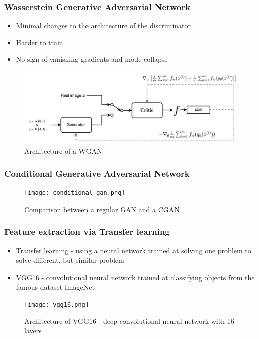 \documentclass{beamer}
\begin{document}
\begin{frame}
\frametitle{Wasserstein Generative Adversarial Network}
\begin{itemize}
\item Minimal changes to the architecture of the discriminator
\item Harder to train
\item No sign of vanishing gradients and mode collapse
\end{itemize}
\begin{figure}[ht]
    \includegraphics[scale=0.3]{wgan_training.jpeg}
    \caption{Architecture of a WGAN}
    \label{fig:cgan}
\end{figure}
\end{frame}

\begin{frame}
\frametitle{Conditional Generative Adversarial Network}
\begin{figure}[ht]
    \texttt{[image: conditional\_gan.png]}
    \caption{Comparison between a regular GAN and a CGAN}
    \label{fig:cgan}
\end{figure}
\end{frame}

\begin{frame}
\frametitle{Feature extraction via Transfer learning}
\begin{itemize}
\item Transfer learning - using a neural network trained at solving one problem to solve different, but similar problem
\item VGG16 - convolutional neural network trained at classifying objects from the famous dataset ImageNet
\end{itemize}

\begin{figure}[ht]
    \centering
    \texttt{[image: vgg16.png]}
    \caption{Architecture of VGG16 - deep convolutional neural network with 16 layers}
    \label{fig:vgg16}
\end{figure}

\end{frame}
\end{document}
